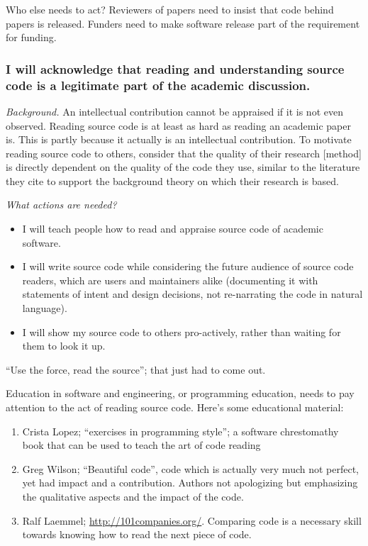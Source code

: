 \documentclass[a4paper,UKenglish]{dagman}
\renewcommand{\paragraph}[1]{\subsubsection*{#1}\xspace}
\begin{document}
Who else needs to act?
Reviewers of papers need to insist that code behind papers is released. Funders need to make software release part of the requirement for funding.


\paragraph{I will acknowledge that reading and understanding source code is a legitimate part of the academic discussion.}


\emph{Background.}
An intellectual contribution cannot be appraised if it is not even observed. Reading source code is at least as hard as reading an academic paper is. This is partly because it actually is an intellectual contribution. To motivate reading source code to others, consider that the quality of their research [method] is directly dependent on the quality of the code they use, similar to the literature they cite to support the background theory on which their research is based. 

\emph{What actions are needed?}
\begin{itemize}
\item I will teach people how to read and appraise source code of academic software.
\item I will write source code while considering the future audience of source code readers, which are users and maintainers alike (documenting it with statements of intent and design decisions, not re-narrating the code in natural language).
\item I will show my source code to others pro-actively, rather than waiting for them to look it up.
\end{itemize}

``Use the force, read the source''; that just had to come out.

Education in software and engineering, or programming education, needs to pay attention to the act of reading source code. Here's some educational material:
\begin{enumerate}
\item Crista Lopez; ``exercises in programming style''; a software chrestomathy book that can be used to teach the art of code reading
\item Greg Wilson; ``Beautiful code'', code which is actually very much not perfect, yet had impact and a contribution. Authors not apologizing but emphasizing the qualitative aspects and the impact of the code.
\item Ralf Laemmel; \url{http://101companies.org/}. Comparing code is a necessary skill towards knowing how to read the next piece of code.
\end{enumerate}
\end{document}
